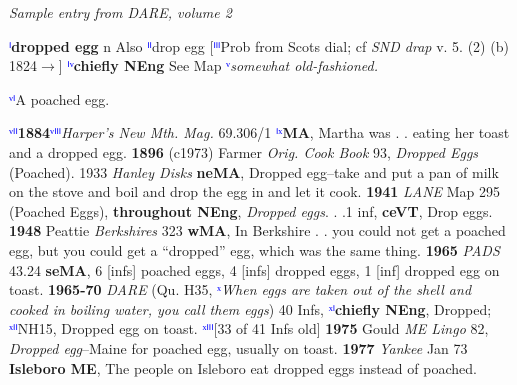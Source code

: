 \documentclass[output=paper]{langscibook}
\begin{document}
\begin{exe}
    
\ex \textit{Sample entry from DARE, volume 2}	\label{vaux:ex:dare}


\textcolor{blue}{ⁱ}\textbf{dropped egg} n Also \textcolor{blue}{ⁱⁱ}drop egg [\textcolor{blue}{ⁱⁱⁱ}Prob from Scots dial; cf \textit{SND  drap} v. 5. (2) (b) 1824$\rightarrow$] \textcolor{blue}{ⁱᵛ}\textbf{chiefly NEng} See Map \textcolor{blue}{ᵛ}\textit{somewhat old-fashioned.} 
 
	\textcolor{blue}{ᵛⁱ}A poached egg. 

 
	\textcolor{blue}{ᵛⁱⁱ}\textbf{1884}\textcolor{blue}{ᵛⁱⁱⁱ}\textit{Harper's New Mth. Mag.} 69.306/1 \textcolor{blue}{ⁱˣ}\textbf{MA}, Martha was . . eating her toast and a dropped egg. \textbf{1896} (c1973) Farmer \textit{Orig. Cook Book} 93, \textit{Dropped Eggs} (Poached). 1933 \textit{Hanley Disks} \textbf{neMA}, Dropped egg--take and put a pan of milk on the stove and boil and drop the egg in and let it cook. \textbf{1941} \textit{LANE} Map 295 (Poached Eggs), \textbf{throughout NEng}, \textit{Dropped eggs}. . .1 inf, \textbf{ceVT}, Drop eggs. \textbf{1948} Peattie \textit{Berkshires} 323 \textbf{wMA}, In Berkshire . . you could not get a poached egg, but you could get a ``dropped'' egg, which was the same thing. \textbf{1965} \textit{PADS} 43.24 \textbf{seMA}, 6 [infs] poached eggs, 4 [infs] dropped eggs, 1 [inf] dropped egg on toast. \textbf{1965-70} \textit{DARE} (Qu. H35, \textcolor{blue}{ˣ}\textit{When eggs are taken out of the shell and cooked in boiling water, you call them \underline{\hspace{1cm}} eggs}) 40 Infs, \textcolor{blue}{ˣⁱ}\textbf{chiefly NEng}, Dropped; \textcolor{blue}{ˣⁱⁱ}NH15, Dropped egg on toast. \textcolor{blue}{ˣⁱⁱⁱ}[33 of 41 Infs old]  \textbf{1975} Gould \textit{ME Lingo} 82, \textit{Dropped egg}--Maine for poached egg, usually on toast. \textbf{1977} \textit{Yankee} Jan 73 \textbf{Isleboro ME}, The people on Isleboro eat dropped eggs instead of poached. 
	
\end{exe}
\end{document}

